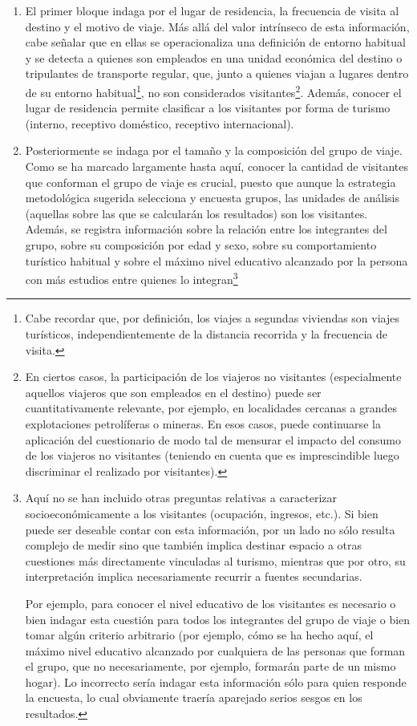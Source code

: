 \documentclass[
]{book}
\begin{document}
\begin{enumerate}
\def\labelenumi{\arabic{enumi}.}
\item
  El primer bloque indaga por el lugar de residencia, la frecuencia de visita al destino y el motivo de viaje. Más allá del valor intrínseco de esta información, cabe señalar que en ellas se operacionaliza una definición de entorno habitual y se detecta a quienes son empleados en una unidad económica del destino o tripulantes de transporte regular, que, junto a quienes viajan a lugares dentro de su entorno habitual\footnote{Cabe recordar que, por definición, los viajes a segundas viviendas son viajes turísticos, independientemente de la distancia recorrida y la frecuencia de visita.}, no son considerados visitantes\footnote{En ciertos casos, la participación de los viajeros no visitantes (especialmente aquellos viajeros que son empleados en el destino) puede ser cuantitativamente relevante, por ejemplo, en localidades cercanas a grandes explotaciones petrolíferas o mineras. En esos casos, puede continuarse la aplicación del cuestionario de modo tal de mensurar el impacto del consumo de los viajeros no visitantes (teniendo en cuenta que es imprescindible luego discriminar el realizado por visitantes).}. Además, conocer el lugar de residencia permite clasificar a los visitantes por forma de turismo (interno, receptivo doméstico, receptivo internacional).
\item
  Posteriormente se indaga por el tamaño y la composición del grupo de viaje. Como se ha marcado largamente hasta aquí, conocer la cantidad de visitantes que conforman el grupo de viaje es crucial, puesto que aunque la estrategia metodológica sugerida selecciona y encuesta grupos, las unidades de análisis (aquellas sobre las que se calcularán los resultados) son los visitantes. Además, se registra información sobre la relación entre los integrantes del grupo, sobre su composición por edad y sexo, sobre su comportamiento turístico habitual y sobre el máximo nivel educativo alcanzado por la persona con más estudios entre quienes lo integran\footnote{Aquí no se han incluido otras preguntas relativas a caracterizar socioeconómicamente a los visitantes (ocupación, ingresos, etc.). Si bien puede ser deseable contar con esta información, por un lado no sólo resulta complejo de medir sino que también implica destinar espacio a otras cuestiones más directamente vinculadas al turismo, mientras que por otro, su interpretación implica necesariamente recurrir a fuentes secundarias.

    Por ejemplo, para conocer el nivel educativo de los visitantes es necesario o bien indagar esta cuestión para todos los integrantes del grupo de viaje o bien tomar algún criterio arbitrario (por ejemplo, cómo se ha hecho aquí, el máximo nivel educativo alcanzado por cualquiera de las personas que forman el grupo, que no necesariamente, por ejemplo, formarán parte de un mismo hogar). Lo incorrecto sería indagar esta información sólo para quien responde la encuesta, lo cual obviamente traería aparejado serios sesgos en los resultados.

}
\end{enumerate}
\end{document}
